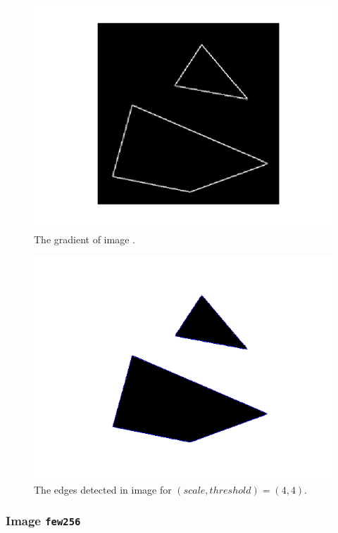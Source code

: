     \begin{figure}[H]
      \centering
      \includegraphics[scale=0.8]{./images/Q8/houghtest256/3.png}
      \caption{The gradient of image .}
      \label{fig:Q8_houghtest256_3}
    \end{figure}

    \begin{figure}[H]
      \centering
      \includegraphics[scale=0.8]{./images/Q8/houghtest256/4.png}
      \caption{The edges detected in image  for
        $(scale, threshold) = (4,4)$.}
      \label{fig:Q8_houghtest256_4}
    \end{figure}


  \subsubsection{Image \texttt{few256}}


